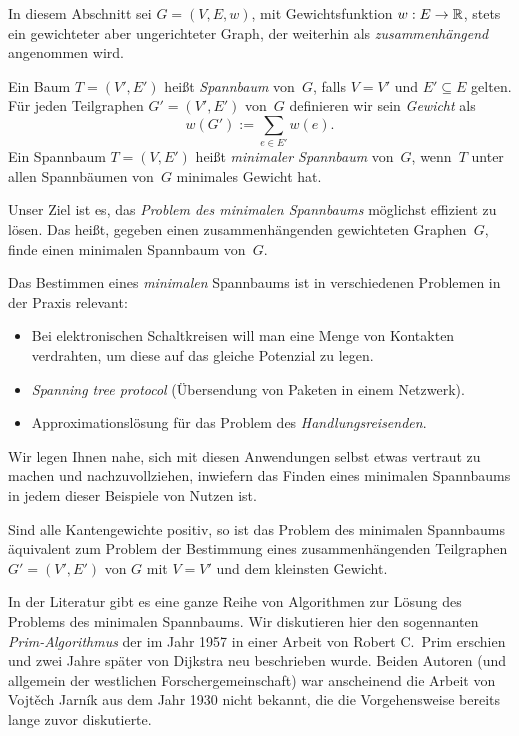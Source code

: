 \begin{bem}
In diesem Abschnitt sei $G=(V,E,w)$, mit Gewichtsfunktion $w : E \to \mathbb{R}$, stets ein gewichteter aber ungerichteter Graph, der weiterhin als \emph{zusammenhängend} angenommen wird.
\end{bem}

\begin{defn}
Ein Baum $T=(V',E')$ heißt \emph{Spannbaum} von~$G$, falls $V=V'$ und $E' \subseteq E$ gelten.
Für jeden Teilgraphen $G' = (V', E')$ von~$G$ definieren wir sein \emph{Gewicht} als
\[
w(G') := \sum_{e \in E'} w(e).
\]
%
Ein Spannbaum $T=(V,E')$ heißt \emph{minimaler Spannbaum} von~$G$, wenn~$T$ unter allen Spannbäumen von~$G$ minimales Gewicht hat.
\end{defn} 

\begin{bem} 
Unser Ziel ist es, das \emph{Problem des minimalen Spannbaums} möglichst effizient zu lösen.
Das heißt, gegeben einen zusammenhängenden gewichteten Graphen~$G$, finde einen minimalen Spannbaum von~$G$.

Das Bestimmen eines \emph{minimalen} Spannbaums ist in verschiedenen Problemen in der Praxis relevant:
%
\begin{itemize}
 \item Bei elektronischen Schaltkreisen will man eine Menge von Kontakten verdrahten, um diese auf das gleiche Potenzial zu legen.
 \item \emph{Spanning tree protocol} (Übersendung von Paketen in einem Netzwerk).
 \item Approximationslösung für das Problem des \emph{Handlungsreisenden}.
\end{itemize}
Wir legen Ihnen nahe, sich mit diesen Anwendungen selbst etwas vertraut zu machen und nachzuvollziehen, inwiefern das Finden eines minimalen Spannbaums in jedem dieser Beispiele von Nutzen ist.
\end{bem} 



\begin{bem}
Sind alle Kantengewichte positiv, so ist das Problem des minimalen Spannbaums äquivalent zum Problem der Bestimmung eines zusammenhängenden Teilgraphen $G'= (V',E')$ von $G$ mit $V=V'$ und dem kleinsten Gewicht.
\end{bem}

\begin{bem} 
In der Literatur gibt es eine ganze Reihe von Algorithmen zur Lösung des Problems des minimalen Spannbaums.
Wir diskutieren hier den sogennanten \emph{Prim-Algorithmus} der im Jahr 1957 in einer Arbeit von Robert C.~Prim erschien und zwei Jahre später von Dijkstra neu beschrieben wurde.
Beiden Autoren (und allgemein der westlichen Forschergemeinschaft) war anscheinend die Arbeit von Vojt\v{e}ch Jarn\'{i}k aus dem Jahr 1930 nicht bekannt, die die Vorgehensweise bereits lange zuvor diskutierte.
\end{bem} 

